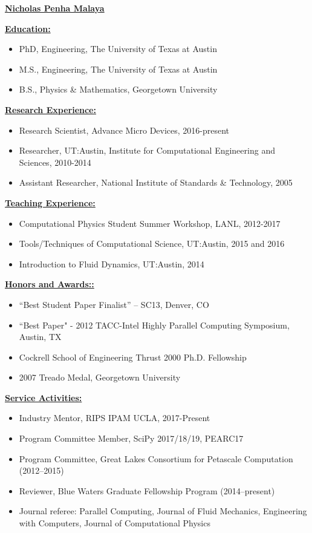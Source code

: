 \documentclass[12pt]{article}
\newcommand{\makeheading}[1]%
        {\hspace*{-\marginparsep minus \marginparwidth}%
         	\begin{center}
                {\underline{\bfseries #1}}\\%
                 \end{center}
         }
\newcommand{\makesection}[1]{\underline{\bfseries #1:}}
\begin{document}
\makeheading{Nicholas Penha Malaya}

\makesection{Education}
\begin{itemize}
\item PhD, Engineering, The University of Texas at Austin
\item M.S., Engineering, The University of Texas at Austin
\item B.S., Physics \& Mathematics, Georgetown University
\end{itemize}

\makesection{Research Experience}
\begin{itemize}
\item Research Scientist, Advance Micro Devices, 2016-present
\item Researcher, UT:Austin, Institute for Computational Engineering and Sciences, 2010-2014
\item Assistant Researcher, National Institute of Standards \& Technology, 2005
\end{itemize}

\makesection{Teaching Experience}
\begin{itemize}
  \item Computational Physics Student Summer Workshop, LANL, 2012-2017
  \item Tools/Techniques of Computational Science, UT:Austin, 2015 and 2016	
  \item Introduction to Fluid Dynamics, UT:Austin, 2014
\end{itemize}

\makesection{Honors and Awards:}
\begin{itemize}
\item ``Best Student Paper Finalist'' -- SC13, Denver, CO	  
\item ``Best Paper" - 2012 TACC-Intel Highly Parallel Computing Symposium, Austin, TX
\item Cockrell School of Engineering Thrust 2000 Ph.D. Fellowship
\item 2007 Treado Medal, Georgetown University
\end{itemize}

\makesection{Service Activities}

\begin{itemize}
 \item Industry Mentor, RIPS IPAM UCLA, 2017-Present
 \item Program Committee Member, SciPy 2017/18/19, PEARC17
 \item Program Committee, Great Lakes Consortium for Petascale Computation (2012--2015)
 \item Reviewer, Blue Waters Graduate Fellowship Program (2014--present)
 \item Journal referee: Parallel Computing, Journal of Fluid Mechanics, Engineering with Computers, Journal of Computational Physics
\end{itemize}
\end{document}
